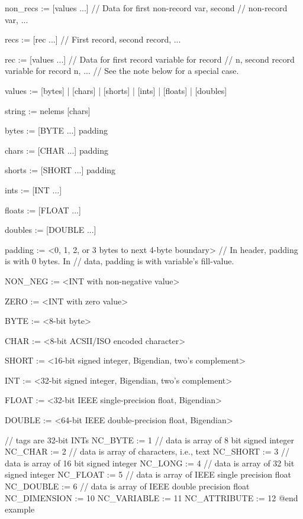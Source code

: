 {non_recs := [values ...]  // Data for first non-record var, second
                          // non-record var, ...

recs    := [rec ...]      // First record, second record, ...

rec     := [values ...]   // Data for first record variable for record
                          // n, second record variable for record n, ...
                          // See the note below for a special case.

values  := [bytes] | [chars] | [shorts] | [ints] | [floats] | [doubles]

string  := nelems  [chars]

bytes   := [BYTE ...]  padding

chars   := [CHAR ...]  padding

shorts  := [SHORT ...]  padding

ints    := [INT ...]

floats  := [FLOAT ...]

doubles := [DOUBLE ...]

padding := <0, 1, 2, or 3 bytes to next 4-byte boundary>
                          // In header, padding is with 0 bytes.  In
                          // data, padding is with variable's fill-value.

NON_NEG := <INT with non-negative value>

ZERO    := <INT with zero value>

BYTE    := <8-bit byte>

CHAR    := <8-bit ACSII/ISO encoded character>

SHORT   := <16-bit signed integer, Bigendian, two's complement>

INT     := <32-bit signed integer, Bigendian, two's complement>

FLOAT   := <32-bit IEEE single-precision float, Bigendian>

DOUBLE  := <64-bit IEEE double-precision float, Bigendian>

// tags are 32-bit INTs
NC_BYTE      := 1         // data is array of 8 bit signed integer
NC_CHAR      := 2         // data is array of characters, i.e., text
NC_SHORT     := 3         // data is array of 16 bit signed integer
NC_LONG      := 4         // data is array of 32 bit signed integer
NC_FLOAT     := 5         // data is array of IEEE single precision float
NC_DOUBLE    := 6         // data is array of IEEE double precision float
NC_DIMENSION := 10
NC_VARIABLE  := 11
NC_ATTRIBUTE := 12
@end example


}
